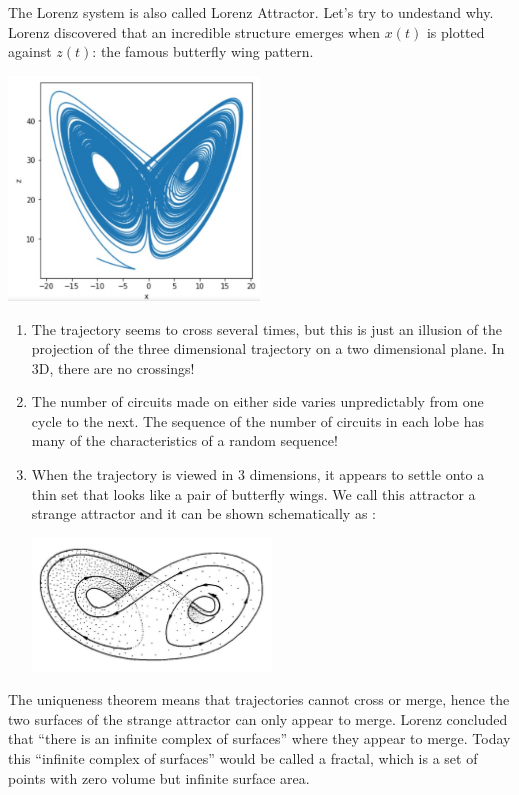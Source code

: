 \documentclass[12pt]{article}
\begin{document}
	The Lorenz system is also called Lorenz Attractor. Let's try to undestand why. Lorenz discovered that an incredible structure emerges when $x(t)$ is plotted against $z(t)$: the famous butterfly wing pattern.
	\begin{center}
		\includegraphics[width=0.5\textwidth]{"images/butterfly.jpg"}
	\end{center}
	\begin{enumerate}[label=\textbullet]
		\item The trajectory seems to cross several times, but this is just an illusion of the projection of the three dimensional trajectory on a two dimensional plane. In 3D, there are no crossings!
		\item The number of circuits made on either side varies unpredictably from one cycle to the next. The sequence of the number of circuits in each lobe has many of the characteristics of a random sequence!
		\item When the trajectory is viewed in 3 dimensions, it appears to settle onto a thin set that looks like a pair of butterfly wings. We call this attractor a strange attractor and it can be shown schematically as :
		\begin{center}
			\includegraphics[width=0.5\textwidth]{"images/butterfly3D.jpg"}
		\end{center}
	\end{enumerate}
	
	\noindent The uniqueness theorem\cite{partie1_ref2} means that trajectories cannot cross or merge, hence the two surfaces of the strange attractor can only appear to merge. Lorenz concluded that “there is an infinite
	complex of surfaces” where they appear to merge. Today this “infinite complex of surfaces” would be called a fractal, which is a set of points with zero volume but infinite surface area.
	
\end{document}

